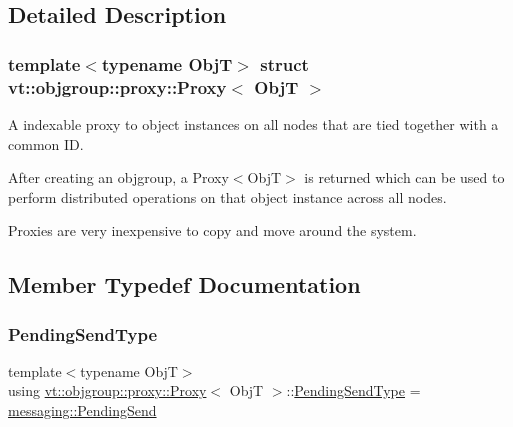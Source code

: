 \subsection{Detailed Description}
\subsubsection*{template$<$typename ObjT$>$\newline
struct vt\+::objgroup\+::proxy\+::\+Proxy$<$ Obj\+T $>$}

A indexable proxy to object instances on all nodes that are tied together with a common ID. 

After creating an objgroup, a Proxy$<$\+Obj\+T$>$ is returned which can be used to perform distributed operations on that object instance across all nodes.

Proxies are very inexpensive to copy and move around the system. 

\subsection{Member Typedef Documentation}
\mbox{\label{structvt_1_1objgroup_1_1proxy_1_1_proxy_a1bdf8713203531d306702a024872bb08}} 
\subsubsection{\texorpdfstring{Pending\+Send\+Type}{PendingSendType}}
{\footnotesize\ttfamily template$<$typename ObjT$>$ \\
using \hyperlink{structvt_1_1objgroup_1_1proxy_1_1_proxy}{vt\+::objgroup\+::proxy\+::\+Proxy}$<$ ObjT $>$\+::\hyperlink{structvt_1_1objgroup_1_1proxy_1_1_proxy_a1bdf8713203531d306702a024872bb08}{Pending\+Send\+Type} =  \hyperlink{structvt_1_1messaging_1_1_pending_send}{messaging\+::\+Pending\+Send}}

\mbox{\label{structvt_1_1objgroup_1_1proxy_1_1_proxy_a337be4c20cf11ff6477c7a66208cc909}} 
